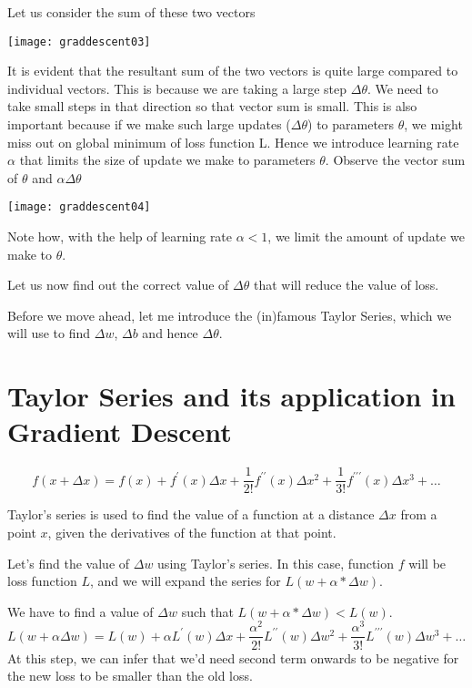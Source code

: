 Let us consider the sum of these two vectors
\begin{marginfigure}
\texttt{[image: graddescent03]}
\end{marginfigure}



It is evident that the resultant sum of the two vectors is quite large compared to individual vectors. This is because we are taking a large step $\Delta  \theta$. We need to take small steps in that direction so that vector sum is small. This is also important because if we make such large updates ($\Delta  \theta$) to parameters $\theta$, we might miss out on global minimum of loss function L. Hence we introduce learning rate $\alpha$  that limits the size of update we make to parameters $\theta$. Observe the vector sum of $\theta$ and $\alpha \Delta  \theta$
\begin{marginfigure}
\texttt{[image: graddescent04]}
\end{marginfigure}



Note how, with the help of learning rate $\alpha  < 1$, we limit the amount of update we make to $\theta$.

Let us now find out the correct value of $\Delta  \theta$ that will reduce the value of loss.

Before we move ahead, let me introduce the (in)famous Taylor Series, which we will use to find $\Delta  w$, $\Delta  b$ and hence $\Delta  \theta$.

\section{Taylor Series and its application in Gradient Descent}
\begin{equation}
f(x+\Delta x)=f(x)+f^{\prime}(x) \Delta x+\frac{1}{2 !} f^{\prime \prime}(x) \Delta x^{2}+\frac{1}{3 !} f^{\prime \prime \prime}(x) \Delta x^{3}+\ldots
\end{equation}

Taylor's series is used to find the value of a function at a distance $\Delta  x$ from a point $x$, given the derivatives of the function at that point.

Let's find the value of $\Delta  w$ using Taylor's series.
In this case, function $f$ will be loss function $L$, and we will expand the series for $L(w + \alpha *\Delta  w)$.

We have to find a value of $\Delta  w$ such that $L(w + \alpha *\Delta  w) < L(w)$.
\begin{equation}
L(w+\alpha \Delta w)=L(w)+\alpha L^{\prime}(w) \Delta x+\frac{\alpha^{2}}{2 !} L^{\prime \prime}(w) \Delta w^{2}+\frac{\alpha^{3}}{3 !} L^{\prime \prime \prime}(w) \Delta w^{3}+\ldots
\end{equation}
At this step, we can infer that we'd need second term onwards to be negative for the new loss to be smaller than the old loss.

